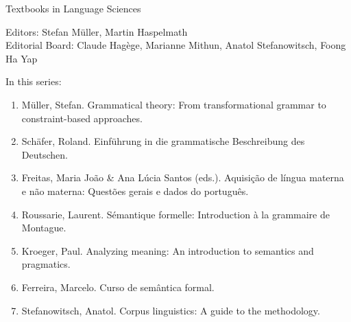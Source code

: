 {\large Textbooks in Language Sciences}

\bigskip

Editors: Stefan Müller, Martin Haspelmath\\
Editorial Board: Claude Hagège, Marianne Mithun, Anatol Stefanowitsch, Foong Ha Yap

\bigskip

In this series:

\begin{enumerate}
\item Müller, Stefan. Grammatical theory: From transformational grammar to constraint-based approaches.
\item Schäfer, Roland. Einführung in die grammatische Beschreibung des Deutschen.
\item Freitas, Maria João \& Ana Lúcia Santos (eds.). Aquisição de língua materna e não materna: Questões gerais e dados do português.
\item Roussarie, Laurent. Sémantique formelle: Introduction à la grammaire de Montague.
\item Kroeger, Paul. Analyzing meaning: An introduction to semantics and pragmatics.
\item Ferreira, Marcelo. Curso de semântica formal.
\item Stefanowitsch, Anatol. Corpus linguistics: A guide to the methodology.
\end{enumerate}
